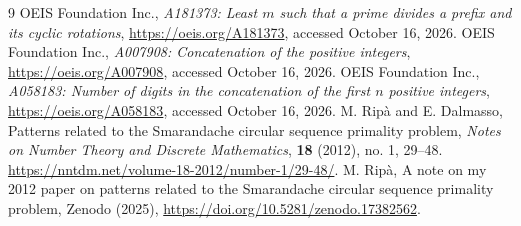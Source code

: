 \documentclass[10pt]{article}
\begin{document}
\begin{thebibliography}{9}
 OEIS Foundation Inc.,
\emph{A181373: Least $m$ such that a prime divides a prefix and its cyclic rotations},
\url{https://oeis.org/A181373}, accessed October 16, 2026.
 OEIS Foundation Inc.,
\emph{A007908: Concatenation of the positive integers},
\url{https://oeis.org/A007908}, accessed October 16, 2026.
 OEIS Foundation Inc.,
\emph{A058183: Number of digits in the concatenation of the first $n$ positive integers},
\url{https://oeis.org/A058183}, accessed October 16, 2026.
 M. Rip\`a and E. Dalmasso,
Patterns related to the Smarandache circular sequence primality problem,
\emph{Notes on Number Theory and Discrete Mathematics},
\textbf{18} (2012), no. 1, 29--48.
\url{https://nntdm.net/volume-18-2012/number-1/29-48/}.
 M. Rip\`a,
A note on my 2012 paper on patterns related to the Smarandache circular sequence primality problem,
Zenodo (2025), \url{https://doi.org/10.5281/zenodo.17382562}.
\end{thebibliography}
\end{document}
